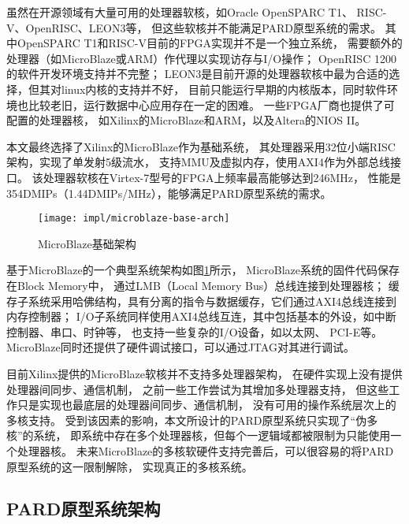 虽然在开源领域有大量可用的处理器软核，如Oracle OpenSPARC T1\cite{opensparct1}、
RISC-V\cite{riscv}、OpenRISC\cite{or1k}、LEON3\cite{leon3}等，
但这些软核并不能满足PARD原型系统的需求。
其中OpenSPARC T1和RISC-V目前的FPGA实现并不是一个独立系统，
需要额外的处理器（如MicroBlaze或ARM）作代理以实现访存与I/O操作；
OpenRISC 1200的软件开发环境支持并不完整；
LEON3是目前开源的处理器软核中最为合适的选择，但其对linux内核的支持并不好，
目前只能运行早期的内核版本，同时软件环境也比较老旧，运行数据中心应用存在一定的困难。
一些FPGA厂商也提供了可配置的处理器核，
如Xilinx的MicroBlaze\cite{microblaze}和ARM\cite{zynq}，以及Altera的NIOS II\cite{niosii}。

本文最终选择了Xilinx的MicroBlaze作为基础系统，
其处理器采用32位小端RISC架构，实现了单发射5级流水，
支持MMU及虚拟内存，使用AXI4作为外部总线接口\cite{microblaze-ref}。
该处理器软核在Virtex-7型号的FPGA上频率最高能够达到246MHz，
性能是354DMIPs（1.44DMIPs/MHz）\cite{microblaze}，能够满足PARD原型系统的需求。

\begin{figure}[tb]
  \centering
  \texttt{[image: impl/microblaze-base-arch]}
  \caption{MicroBlaze基础架构}
  \label{fig:microblaze-base-arch}
\end{figure}


基于MicroBlaze的一个典型系统架构如图\ref{fig:microblaze-base-arch}所示，
MicroBlaze系统的固件代码保存在Block Memory中，
通过LMB（Local Memory Bus）总线连接到处理器核；
缓存子系统采用哈佛结构，具有分离的指令与数据缓存，它们通过AXI4总线连接到内存控制器；
I/O子系统同样使用AXI4总线互连，其中包括基本的外设，如中断控制器、串口、时钟等，
也支持一些复杂的I/O设备，如以太网\cite{axi-ethernet-subsystem}、
PCI-E\cite{axi-pcie-bridge}等。
MicroBlaze同时还提供了硬件调试接口，可以通过JTAG对其进行调试。

目前Xilinx提供的MicroBlaze软核并不支持多处理器架构，
在硬件实现上没有提供处理器间同步、通信机制，
之前一些工作\cite{microblaze-mp-rsp08,microblaze-mp-xapp}尝试为其增加多处理器支持，
但这些工作只是实现也最底层的处理器间同步、通信机制，
没有可用的操作系统层次上的多核支持。
受到该因素的影响，本文所设计的PARD原型系统只实现了``伪多核''的系统，
即系统中存在多个处理器核，但每个一逻辑域都被限制为只能使用一个处理器核。
未来MicroBlaze的多核软硬件支持完善后，可以很容易的将PARD原型系统的这一限制解除，
实现真正的多核系统。


\subsection{PARD原型系统架构}

